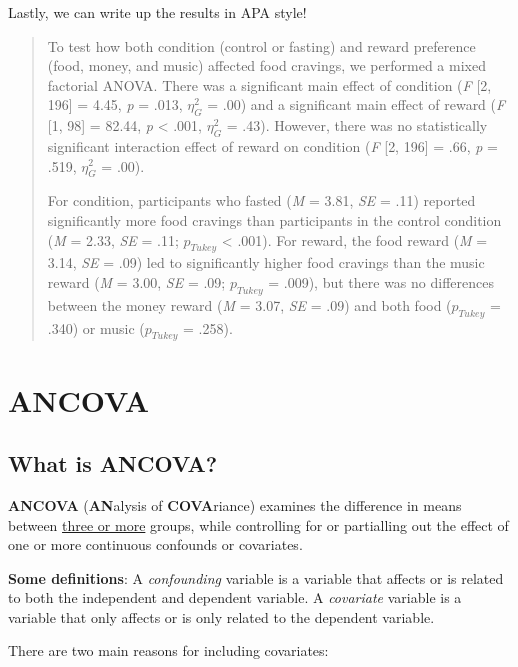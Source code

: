 \documentclass[
]{book}
\begin{document}
Lastly, we can write up the results in APA style!

\begin{quote}
To test how both condition (control or fasting) and reward preference (food, money, and music) affected food cravings, we performed a mixed factorial ANOVA. There was a significant main effect of condition (\emph{F} {[}2, 196{]} = 4.45, \emph{p} = .013, \(\eta^2_G\) = .00) and a significant main effect of reward (\emph{F} {[}1, 98{]} = 82.44, \emph{p} \textless{} .001, \(\eta^2_G\) = .43). However, there was no statistically significant interaction effect of reward on condition (\emph{F} {[}2, 196{]} = .66, \emph{p} = .519, \(\eta^2_G\) = .00).

For condition, participants who fasted (\emph{M} = 3.81, \emph{SE} = .11) reported significantly more food cravings than participants in the control condition (\emph{M} = 2.33, \emph{SE} = .11; \(p_{Tukey}\) \textless{} .001). For reward, the food reward (\emph{M} = 3.14, \emph{SE} = .09) led to significantly higher food cravings than the music reward (\emph{M} = 3.00, \emph{SE} = .09; \(p_{Tukey}\) = .009), but there was no differences between the money reward (\emph{M} = 3.07, \emph{SE} = .09) and both food (\(p_{Tukey}\) = .340) or music (\(p_{Tukey}\) = .258).
\end{quote}

\hypertarget{ancova}{%
\chapter{ANCOVA}\label{ancova}}

\hypertarget{what-is-ancova}{%
\section{What is ANCOVA?}\label{what-is-ancova}}

\textbf{ANCOVA} (\textbf{AN}alysis of \textbf{COVA}riance) examines the difference in means between \underline{three or more} groups, while controlling for or partialling out the effect of one or more continuous confounds or covariates.

\textbf{Some definitions}: A \emph{confounding} variable is a variable that affects or is related to both the independent and dependent variable. A \emph{covariate} variable is a variable that only affects or is only related to the dependent variable.

There are two main reasons for including covariates:
\end{document}
